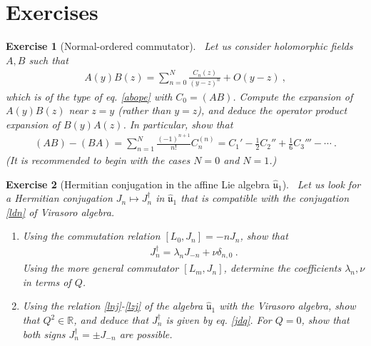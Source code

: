 \documentclass[12pt, a4paper, notitlepage, twoside]{report}
\numberwithin{equation}{section}
\theoremstyle{break}
\newtheorem{exo}{Exercise}[chapter]
\begin{document}
\section{Exercises}

\begin{exo}[Normal-ordered commutator]
~\label{exoabba}
Let us consider holomorphic fields $A,B$ such that 
\begin{align}
 A(y)B(z) = \sum_{n=0}^N \frac{C_n(z)}{(y-z)^n} + O(y-z)\ ,
\end{align}
which is of the type of eq. \eqref{abope} with $C_0 = (AB)$. 
Compute the expansion of $A(y)B(z)$ near $z=y$ (rather than $y=z$), and deduce the operator product expansion of $B(y)A(z)$. 
In particular, show that 
\begin{align}
 (AB)-(BA) = \sum_{n=1}^N \frac{(-1)^{n+1}}{n!} C_n^{(n)} = C_1'-\frac12 C_2'' + \frac16 C_3''' -\cdots \ .
\end{align}
(It is recommended to begin with the cases $N=0$ and $N=1$.)
\end{exo}

\begin{exo}[Hermitian conjugation in the affine Lie algebra $\hat{\mathfrak{u}}_1$]
~\label{exocuo}
Let us look for a Hermitian conjugation $J_n\mapsto J_n^\dagger$ in $\hat{\mathfrak{u}}_1$ that is compatible with the conjugation \eqref{ldn} of Virasoro algebra.
\begin{enumerate}
 \item Using the commutation relation $[L_0,J_n]=-nJ_n$, show that 
 \begin{align}
  J_n^\dagger =\lambda_n J_{-n} + \nu\delta_{n,0}\ .
 \end{align}
Using the more general commutator $[L_m,J_n]$, determine the coefficients $\lambda_n,\nu$ in terms of $Q$. 
\item 
Using the relation \eqref{lnj}-\eqref{lzj} of the algebra $\hat{\mathfrak{u}}_1$ with the Virasoro algebra, show that $Q^2\in\mathbb{R}$, and deduce that $J_n^\dagger$ is given by eq. \eqref{jdq}. For $Q=0$, show that both signs $J_n^\dagger = \pm J_{-n}$ are possible.
\end{enumerate}

\end{exo}
\end{document}
